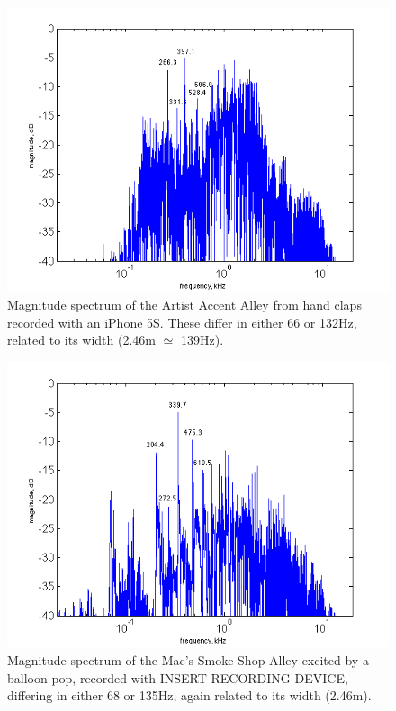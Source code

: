 \documentclass{aes137}
\begin{document}
\begin{figure}[h!] \centering \includegraphics[width=\linewidth]{images/artists_labeled_IR.png} 
\caption{Magnitude spectrum of the Artist Accent Alley from hand claps
  recorded with an iPhone 5S. These differ in either 66 or 132Hz,
  related to its width (2.46m $\simeq$ 139Hz).}
\end{figure}

\begin{figure}[h!] \centering \includegraphics[width=\linewidth]{images/macs_labeled_IR.png} 
\caption{Magnitude spectrum of the Mac's Smoke Shop Alley excited by a
  balloon pop, recorded with INSERT RECORDING DEVICE, differing in
  either 68 or 135Hz, again related to its width (2.46m).}
\end{figure}
\end{document}
